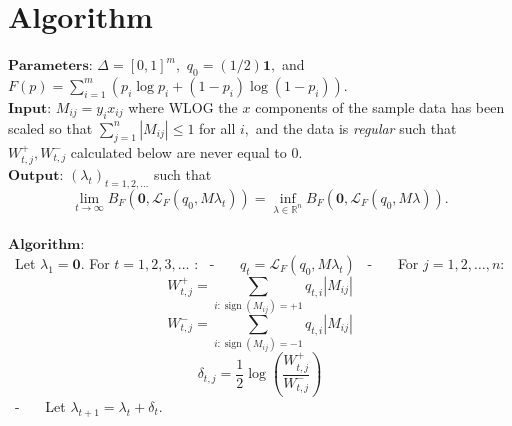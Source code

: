 \documentclass[BSc]{usydthesis}
\numberwithin{equation}{chapter}
\theoremstyle{remark}
\begin{document}
\section{Algorithm}
$\mathbf{Parameters}$: $\Delta = [0,1]^m,$ $q_0 = (1/2) \mathbf{1},$ and $F(p) = \sum_{i=1}^m \left( p_i \log p_i + (1-p_i) \log(1-p_i) \right).$\
\newline \\
$\mathbf{Input}$: $M_{ij} = y_i x_{ij}$ where WLOG the $x$ components of the sample data has been scaled so that $\sum_{j=1}^n |M_{ij}| \leq 1$ for all $i,$ and the data is {\em regular} such that $W^+_{t,j}, W^-_{t,j}$ calculated below are never equal to $0.$ \
\newline \\
$\mathbf{Output}$: $(\lambda_t)_{t=1,2,\ldots}$ such that $$ \lim_{t\to\infty} B_F(\mathbf{0}, \mathcal{L}_F(q_0, M\lambda_t)) = \inf_{\lambda\in\mathbb{R}^n} B_F(\mathbf{0}, \mathcal{L}_F(q_0, M\lambda)).$$ \
\newline \\
$\mathbf{Algorithm}$: \\
\ Let $\lambda_1=\mathbf{0}.$
\newline For $t=1,2,3, \ldots$ : \
\newline - \ \ \ $q_t = \mathcal{L}_F(q_0, M\lambda_t)$ \
\newline - \ \ \ For $j=1,2,\ldots, n:$ $$W^+_{t,j} = \sum_{i : \operatorname{sign}(M_{ij}) = +1 } q_{t,i} |M_{ij}|$$ $$ W^-_{t,j} = \sum_{i : \operatorname{sign}(M_{ij}) = -1 } q_{t,i} |M_{ij}|$$ $$ \delta_{t,j} = \frac{1}{2} \log \left( \frac{ W^+_{t,j}}{W^-_{t,j}} \right) $$\
\newline - \ \ \ Let $\lambda_{t+1} = \lambda_t + \delta_t.$ 
\end{document}
